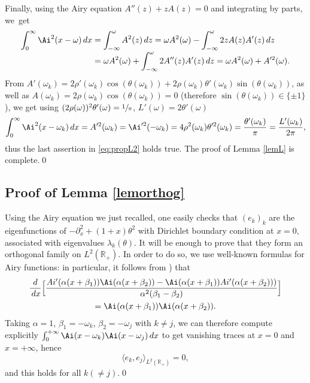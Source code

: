 Finally, using the Airy equation $A''(z)+z A(z)=0$ and integrating by parts, we~get\vspace*{-3pt}
\begin{align*}
\int_{0}^{\infty}\Ai^2(x-\omega)\,dx&=\int_{-\infty}^{\omega}A^2(z)\,dz  =\omega A^2(\omega)-\int_{-\infty}^{\omega}2zA(z)A'(z)\,dz\\[
-3pt]
& =\omega A^2(\omega)+\int_{-\infty}^{\omega}2A''(z)A'(z)\,dz =\omega A^2(\omega)+A'^2(\omega).
\end{align*}
From $A'(\omega_k)=2\rho'(\omega_k)\cos(\theta(\omega_k))+2\rho(\omega_k)\theta'(\omega_k)\sin(\theta(\omega_k))$, as well as $A(\omega_k)=2\rho(\omega_k)\cos(\theta(\omega_k))=0$ (therefore $\sin(\theta(\omega_k))\in \{\pm1\}$), we get using $(2\rho(\omega))^2\theta'(\omega)=\sfrac{1}{\pi}$, $L'(\omega)=2\theta'(\omega)$\vspace*{-3pt}
\[
\int_0^{\infty}\Ai^2(x-\omega_k)\,dx=A'^2(\omega_k)=\Ai'^2(-\omega_k)=4\rho^2(\omega_k)\theta'^2(\omega_k)=\frac{\theta'(\omega_k)}{\pi}=\frac{L'(\omega_k)}{2\pi},
\]
thus the last assertion in \eqref{eq:propL2} holds true. The proof of Lemma \ref{lemL} is complete.\qed
\subsection{Proof of Lemma \ref{lemorthog}}
Using the Airy equation we just recalled, one easily checks that $(e_k)_{k}$ are the eigenfunctions of $-\partial^2_x+(1+x)\theta^2$ with Dirichlet boundary condition at $x=0$, associated with eigenvalues $\lambda_k(\theta)$. It will be enough to prove that they form an orthogonal family on $L^2(\mathbb{R}_+)$. In order to do so, we use well-known formulas for Airy functions: in particular, it follows from \cite[(3.53)]{AFbook}) that\vspace*{-3pt}
\begin{multline*}
\frac{d}{\,dx} \Big[\frac{Ai'(\alpha(x+\beta_1))\Ai(\alpha(x+\beta_2))-\Ai(\alpha(x+\beta_1))Ai'(\alpha(x+\beta_2)))} {\alpha^2(\beta_1-\beta_2)}\Big]\\ = \Ai(\alpha(x+\beta_1))\Ai(\alpha(x+\beta_2)).
\end{multline*}
Taking $\alpha=1$, $\beta_1=-\omega_k$, $\beta_2=-\omega_j$ with $k\neq j$, we can therefore compute explicitly $\int_{0}^{+\infty} \Ai(x-\omega_{k})\Ai(x-\omega_{j})\,dx$ to get vanishing traces at $x=0$ and $x=+\infty$, hence\vspace*{-3pt}
\[
\langle e_k,e_j \rangle_{L^2(\mathbb{R}_+)}=0,
\]
and this holds for all $k(\neq j)$.\qed

